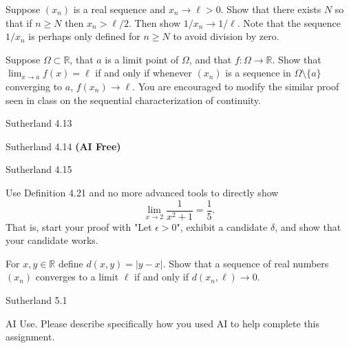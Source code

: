 \documentclass[minion]{homework}
\newcommand{\Reals}{\ensuremath{\mathbb R}}%
\begin{document}
\begin{problems}

\problem  Suppose $(x_n)$ is a real sequence and $x_n\to \ell > 0$.
Show that there exists $N$ so that if $n\ge N$ then $x_n>\ell/2$.
Then show $1/x_n \to 1/\ell$. Note that the sequence $1/x_n$ is 
perhaps only defined for $n\ge N$ to avoid division by zero.

\problem Suppose $\Omega\subset\Reals$, that $a$ is a limit point of $\Omega$, 
and that $f:\Omega\to\Reals$.  Show that $\lim_{x\to a}f(x) =\ell$ if
and only if whenever $(x_n)$ is a sequence in $\Omega\setminus\{a\}$ converging to $a$,
$f(x_n) \to \ell$.  You are encouraged to modify the similar proof seen in 
class on the sequential characterization of continuity.

\problem Sutherland 4.13

\problem Sutherland 4.14 \textbf{(AI Free)}

\problem Sutherland 4.15

\problem Use Definition 4.21 and no more advanced tools to directly show 
\[
\lim_{x\to 2} \frac{1}{x^2+1} = \frac{1}5.
\]
That is, start your proof with "Let $\epsilon>0$", exhibit a candidate
$\delta$, and show that your candidate works.

\problem For $x,y\in \Reals$ define $d(x,y) = |y-x|$.  
Show that a sequence of real numbers $(x_n)$ converges to 
a limit $\ell$ if and only if $d(x_n, \ell)\to 0$.

\problem Sutherland 5.1

\problem AI Use. Please describe specifically how you used AI to help complete this assignment.

\end{problems}
\end{document}
